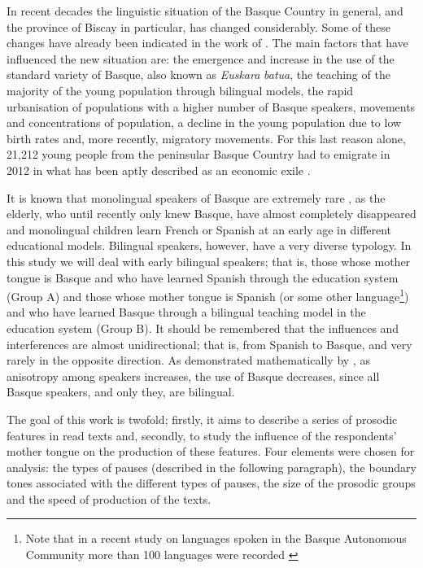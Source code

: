 \documentclass[output=paper]{langsci/langscibook}
\begin{document}
In recent decades the linguistic situation of the Basque Country in general, and the province of Biscay in particular, has changed considerably. Some of these changes have already been indicated in the work of \citet{Gaminde.2010}. The main factors that have influenced the new situation are: the emergence and increase in the use of the standard variety of Basque, also known as \textit{Euskara} \textit{batua}, the teaching of the majority of the young population through bilingual models, the rapid urbanisation of populations with a higher number of Basque speakers, movements and concentrations of population, a decline in the young population due to low birth rates and, more recently, migratory movements. For this last reason alone, 21,212 young people from the peninsular Basque Country had to emigrate in 2012 in what has been aptly described as an economic exile \citep{Egana.2016}.
    
It is known that monolingual speakers of Basque are extremely rare \citep{Txillardegi.2002}, as the elderly, who until recently only knew Basque, have almost completely disappeared and monolingual children learn French or Spanish at an early age in different educational models. Bilingual speakers, however, have a very diverse typology. In this study we will deal with early bilingual speakers; that is, those whose mother tongue is Basque and who have learned Spanish through the education system (Group A) and those whose mother tongue is Spanish (or some other language\footnote{Note that in a recent study on languages spoken in the Basque Autonomous Community more than 100 languages were recorded \citep{Uranga.2008}}) and who have learned Basque through a bilingual teaching model in the education system (Group B). It should be remembered that the influences and interferences are almost unidirectional; that is, from Spanish to Basque, and very rarely in the opposite direction. As demonstrated mathematically by \citet{Txillardegi.2002}, as anisotropy among speakers increases, the use of Basque decreases, since all Basque speakers, and only they, are bilingual.

The goal of this work is twofold; firstly, it aims to describe a series of prosodic features in read texts and, secondly, to study the influence of the respondents’ mother tongue on the production of these features. Four elements were chosen for analysis: the types of pauses (described in the following paragraph), the boundary tones associated with the different types of pauses, the size of the prosodic groups and the speed of production of the texts.
\end{document}
